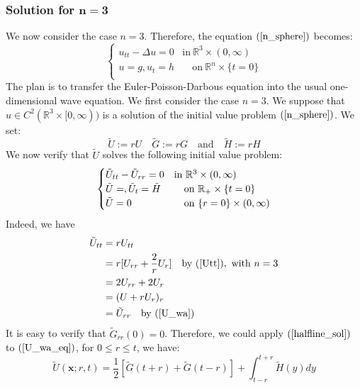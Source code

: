 \documentclass[10pt]{article}
\def\rr{{\mathbb R}}
\def\vc{{\mathbf x}}
\begin{document}
\subsubsection{Solution for $\mathbf{n=3}$}
We now consider the case $n=3$. Therefore, the equation $(\ref{n_sphere})$ becomes:
\begin{equation}
    \label{3_sphere}
    \begin{cases}
        u_{tt} -\Delta u = 0 & \text{in} \ \mathbb{R}^3 \times (0,\infty) \\
        u = g, u_t = h & \quad \text{on} \ \rr^n \times \{t=0\} \\
    \end{cases}
\end{equation}
The plan is to transfer the Euler-Poisson-Darbous equation into the usual one-dimensional wave equation. We first consider the case $n=3$. We suppose that $u \in C^2(\mathbb{R}^3 \times [0,\infty))$ is a solution of the initial value problem $(\ref{n_sphere})$. We set:
\begin{equation}
    \label{U_wa}
    \tilde{U} := r U \quad \tilde{G} := rG \quad \text{and} \quad \tilde{H} := r H
\end{equation}
We now verify that $\tilde{U}$ solves the following initial value problem:
\begin{equation}
    \label{U_wa_eq}
    \begin{cases}
        \tilde{U}_{tt} - \tilde{U}_{rr} = 0 & \text{in} \ \mathbb{R}^3 \times (0,\infty) \\
        \tilde{U} = \title{G}, \tilde{U}_t = \tilde{H}& \quad \text{on} \ \rr_+ \times \{t=0\} \\
        \tilde{U} = 0 & \quad \text{on}\ \{r=0\} \times (0,\infty)
    \end{cases}
\end{equation}
Indeed, we have
\begin{align*}
    \tilde{U}_{tt} &= r U_{tt}\\
    &= r[U_{rr}+\frac{2}{r}U_r] \quad \text{by} \ (\ref{Utt}), \ \text{with}\ n=3 \\
    &= 2U_{rr} + 2U_r\\
    &= (U+rU_r)_r\\
    &= \tilde{U}_{rr} \quad \text{by} \ (\ref{U_wa})
\end{align*}
It is easy to verify that $\tilde{G}_{rr}(0)=0$. Therefore, we could apply $(\ref{halfline_sol})$ to $(\ref{U_wa_eq})$, for $0 \leq r \leq t$, we have:
\begin{equation}
    \label{U_wa_sol}
    \tilde{U}(\vc; r,t) = \frac{1}{2} \left[\tilde{G}(t+r) + \tilde{G}(t-r) \right]+ \int_{t-r}^{t+r} \tilde{H}(y) dy
\end{equation}
\end{document}
